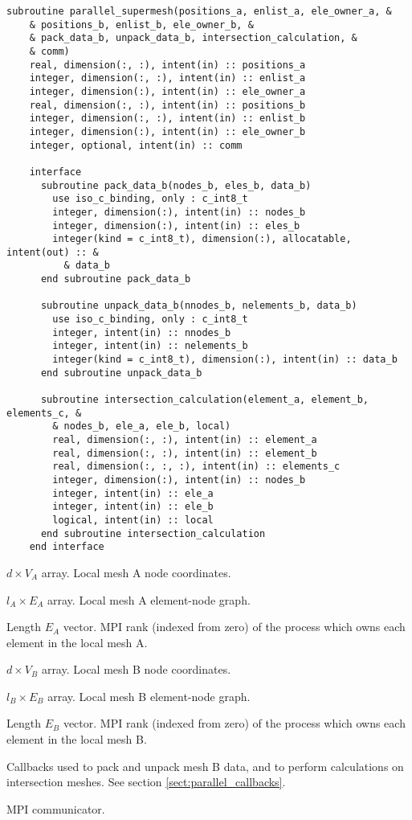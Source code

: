 \documentclass{article}
\begin{document}
\begin{lstlisting}[language=FORTRAN]
  subroutine parallel_supermesh(positions_a, enlist_a, ele_owner_a, &
    & positions_b, enlist_b, ele_owner_b, &
    & pack_data_b, unpack_data_b, intersection_calculation, &
    & comm)
    real, dimension(:, :), intent(in) :: positions_a
    integer, dimension(:, :), intent(in) :: enlist_a
    integer, dimension(:), intent(in) :: ele_owner_a
    real, dimension(:, :), intent(in) :: positions_b
    integer, dimension(:, :), intent(in) :: enlist_b
    integer, dimension(:), intent(in) :: ele_owner_b
    integer, optional, intent(in) :: comm
    
    interface
      subroutine pack_data_b(nodes_b, eles_b, data_b)
        use iso_c_binding, only : c_int8_t
        integer, dimension(:), intent(in) :: nodes_b
        integer, dimension(:), intent(in) :: eles_b
        integer(kind = c_int8_t), dimension(:), allocatable, intent(out) :: &
          & data_b
      end subroutine pack_data_b

      subroutine unpack_data_b(nnodes_b, nelements_b, data_b)
        use iso_c_binding, only : c_int8_t
        integer, intent(in) :: nnodes_b
        integer, intent(in) :: nelements_b
        integer(kind = c_int8_t), dimension(:), intent(in) :: data_b
      end subroutine unpack_data_b
      
      subroutine intersection_calculation(element_a, element_b, elements_c, &
        & nodes_b, ele_a, ele_b, local)
        real, dimension(:, :), intent(in) :: element_a
        real, dimension(:, :), intent(in) :: element_b
        real, dimension(:, :, :), intent(in) :: elements_c
        integer, dimension(:), intent(in) :: nodes_b
        integer, intent(in) :: ele_a
        integer, intent(in) :: ele_b
        logical, intent(in) :: local
      end subroutine intersection_calculation
    end interface
\end{lstlisting}

\begin{description}[font=\ttfamily\bfseries,leftmargin=2.2\parindent,labelindent=1.7\parindent,noitemsep]
  \item[positions\_a] $d \times V_A$ array. Local mesh A node coordinates.
  \item[enlist\_a] $l_A \times E_A$ array. Local mesh A element-node graph.
  \item[ele\_owner\_a] Length $E_A$ vector. MPI rank (indexed from zero) of the
    process which owns each element in the local mesh A.
  \item[positions\_b] $d \times V_B$ array. Local mesh B node coordinates.
  \item[enlist\_b] $l_B \times E_B$ array. Local mesh B element-node graph.
  \item[ele\_owner\_b] Length $E_B$ vector. MPI rank (indexed from zero) of the
    process which owns each element in the local mesh B.
  \item[pack\_data\_b, unpack\_data\_b, intersection\_calculation] Callbacks
    used to pack and unpack mesh B data, and to perform calculations on
    intersection meshes. See section \ref{sect:parallel_callbacks}.
  \item[comm] MPI communicator.
\end{description}
\end{document}
